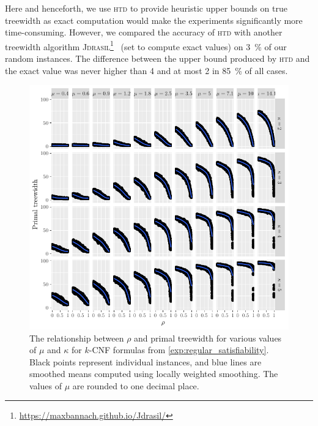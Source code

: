 \documentclass[runningheads]{llncs}
\begin{document}
\begin{remark}
  Here and henceforth, we use \textsc{htd} to provide heuristic upper bounds on
  true treewidth as exact computation would make the experiments significantly
  more time-consuming. However, we compared the accuracy of \textsc{htd} with
  another treewidth algorithm
  \textsc{Jdrasil}\footnote{\url{https://maxbannach.github.io/Jdrasil/}}~\cite{DBLP:conf/wea/BannachBE17}
  (set to compute exact values) on \SI{3}{\percent} of our random instances. The
  difference between the upper bound produced by \textsc{htd} and the exact
  value was never higher than 4 and at most 2 in \SI{85}{\percent} of all cases.
\end{remark}

\begin{figure}[t]
  \centering
  \includegraphics{regular_repetitiveness.pdf}
  \caption{The relationship between $\rho$ and primal treewidth for various
    values of $\mu$ and $\kappa$ for $k$-CNF formulas from
    \cref{exp:regular_satisfiability}. Black points represent individual
    instances, and blue lines are smoothed means computed using locally weighted
    smoothing. The values of $\mu$ are rounded to one decimal
    place.}\label{fig:regular_repetitiveness}
\end{figure}
\end{document}
